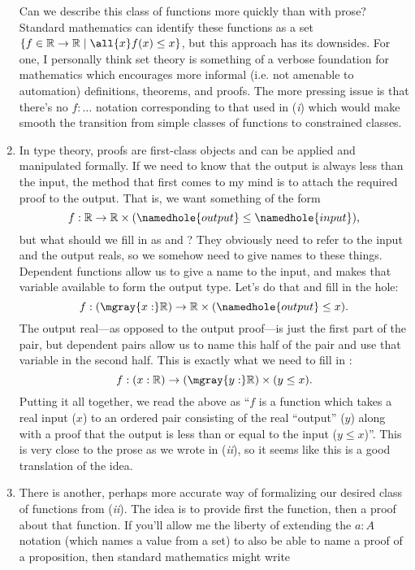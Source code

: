 \documentclass[11pt]{article} %
\theoremstyle{definition}
\theoremstyle{remark}
\newenvironment{aside}
  {\begin{mdframed}[style=0,%
      leftline=false,rightline=false,leftmargin=2em,rightmargin=2em,%
          innerleftmargin=0pt,innerrightmargin=0pt,linewidth=0.75pt,%
      skipabove=7pt,skipbelow=7pt]\small}
  {\end{mdframed}}
\begin{document}
\begin{aside}
\begin{enumerate}[label=\textit{\roman*})]
  Can we describe this class of functions more quickly than with prose?
  Standard mathematics can identify these functions as a set $\{f \in \mathbb R \to \mathbb R \mid \all{x} f(x) \leq x\}$, but this approach has its downsides.
  For one, I personally think set theory is something of a verbose foundation for mathematics which encourages more informal (i.e. not amenable to automation) definitions, theorems, and proofs.
  The more pressing issue is that there's no $f : \ldots$ notation corresponding to that used in (\textit{i}) which would make smooth the transition from simple classes of functions to constrained classes.
\item
  In type theory, proofs are first-class objects and can be applied and manipulated formally.
  If we need to know that the output is always less than the input, the method that first comes to my mind is to attach the required proof to the output.
  That is, we want something of the form
    $$f : \mathbb R \to \mathbb R \times (\namedhole{output} \leq \namedhole{input})\text{,}$$
    but what should we fill in as  and ?
  They obviously need to refer to the input and the output reals, so we somehow need to give names to these things.
  Dependent functions allow us to give a name to the input, and makes that variable available to form the output type.
  Let's do that and fill in the  hole:
    $$f : (\mgray{x :} \mathbb R) \to \mathbb R \times (\namedhole{output} \leq x)\text{.}$$
  The output real---as opposed to the output proof---is just the first part of the pair, but dependent pairs allow us to name this half of the pair and use that variable in the second half.
  This is exactly what we need to fill in :
    $$f : (x : \mathbb R) \to (\mgray{y :} \mathbb R) \times (y \leq x)\text{.}$$
  Putting it all together, we read the above as ``$f$ is a function which takes a real input ($x$) to an ordered pair consisting of the real ``output'' ($y$) along with a proof that the output is less than or equal to the input ($y \leq x$)''.
  This is very close to the prose as we wrote in (\textit{ii}), so it seems like this is a good translation of the idea.
\item
  There is another, perhaps more accurate way of formalizing our desired class of functions from (\textit{ii}).
  The idea is to provide first the function, then a proof about that function.
  If you'll allow me the liberty of extending the $a : A$ notation (which names a value from a set) to also be able to name a proof of a proposition, then standard mathematics might write

\end{enumerate}
\end{aside}
\end{document}
